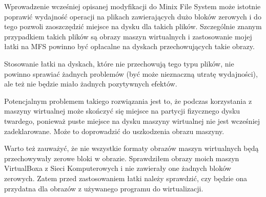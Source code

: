 \documentclass{sig-alternate-05-2015}
\begin{document}
Wprowadzenie wcześniej opisanej modyfikacji do Minix File System może istotnie poprawić wydajność operacji na plikach zawierających dużo bloków zerowych i do tego pozwoli zaoszczędzić miejsce na dysku dla takich plików.
Szczególnie znanym przypadkiem takich plików są obrazy maszyn wirtualnych i zastosowanie mojej łatki na MFS powinno być opłacalne na dyskach przechowujących takie obrazy.\par
Stosowanie łatki na dyskach, które nie przechowują tego typu plików, nie powinno sprawiać żadnych problemów (być może nieznaczną utratę wydajności), ale też nie będzie miało żadnych pozytywnych efektów.\par
Potencjalnym problemem takiego rozwiązania jest to, że podczas korzystania z maszyny wirtualnej może skończyć się miejsce na partycji fizycznego dysku twardego, ponieważ puste miejsce na dysku maszyny wirtualnej nie jest wcześniej zadeklarowane.
Może to doprowadzić do uszkodzenia obrazu maszyny.\par
Warto też zauważyć, że nie wszystkie formaty obrazów maszyn wirtualnych będą przechowywały zerowe bloki w obrazie.
Sprawdziłem obrazy moich maszyn VirtualBoxa z Sieci Komputerowych i nie zawierały one żadnych bloków zerowych.
Zatem przed zastosowaniem łatki należy sprawdzić, czy będzie ona przydatna dla obrazów z używanego programu do wirtualizacji.
\end{document}
